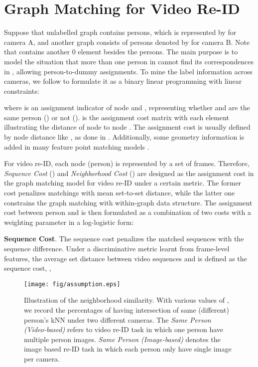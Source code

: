 \documentclass[10pt,twocolumn,letterpaper]{article}
\begin{document}
\section{Graph Matching for Video Re-ID}\label{sec:gm}
Suppose that unlabelled graph  contains  persons, which is represented by  for camera A, and another graph  consists of  persons denoted by  for camera B. Note that  contains another 0 element besides the  persons. The main purpose is to model the situation that more than one person in  cannot find its correspondences in , \ie allowing person-to-dummy assignments. To mine the label information across cameras, we follow \cite{iccv15joint} to formulate it as a binary linear programming with linear constraints:

where  is an assignment indicator of node  and , representing whether  and  are the same person () or not ().  is the assignment cost matrix with each element illustrating the distance of node  to node . The assignment cost is usually defined by node distance like , as done in \cite{cvpr16graph}. Additionally, some geometry information is added in many feature point matching models \cite{ijcv12gm}.

For video re-ID, each node (person) is represented by a set of frames. Therefore, \textit{Sequence Cost} () and \textit{Neighborhood Cost} () are designed as the assignment cost in the graph matching model for video re-ID under a certain metric. The former cost penalizes matchings with mean set-to-set distance, while the latter one constrains the graph matching with within-graph data structure. The assignment cost between person  and  is then formulated as a combination of two costs with a weighting parameter  in a log-logistic form:



\textbf{Sequence Cost}. The sequence cost  penalizes the matched sequences with the sequence difference. Under a discriminative metric  learnt from frame-level features, the average set distance between video sequences  and  is defined as the sequence cost, \ie,

\begin{figure}[t]
  \centering
  \texttt{[image: fig/assumption.eps]}\\
  \caption{\small{Illustration of the neighborhood similarity. With various values of , we record the percentages of having intersection of same (different) person's kNN under two different cameras. The \textit{Same Person (Video-based)} refers to video re-ID task in which one person have multiple person images. \textit{Same Person (Image-based)} denotes the image based re-ID task in which each person only have single image per camera.}}\label{fig:illustration}
\end{figure}
\end{document}
